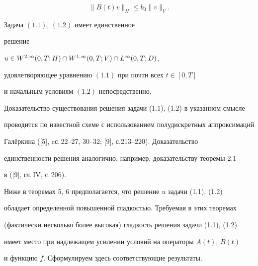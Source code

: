 \begin{equation}


\|B(t)v\|_H\le b_0\|v\|_V.


\end{equation}





\begin{thm}


Задача $(1.1)$, $(1.2)$ имеет единственное


решение


$u\in W^{2,\infty}(0,T;H)\cap\linebreak W^{1,\infty}(0,T;V)\cap


L^{\infty}(0,T;D)$,


удовлетворяющее уравнению $(1.1)$ при почти всех $t\in[0,T]$


и начальным условиям $(1.2)$ непосредственно.


\end{thm}





Доказательство существования решения задачи (1.1), (1.2) в указанном смысле


проводится по известной схеме с использованием полудискретных аппроксимаций


Гал\"еркина ([5], cс.\,22--27, 30--32; [9], с.213--220). Доказательство


единственности решения аналогично, например, доказательству теоремы 2.1


в ([9], гл.\,IV, с.\,206).





Ниже в теоремах 5, 6 предполагается, что решение $u$ задачи (1.1), (1.2)


обладает определенной повышенной гладкостью. Требуемая в этих теоремах


(фактически несколько более высокая) гладкость решения задачи (1.1), (1.2)


имеет место при надлежащем усилении условий на операторы $A(t)$, $B(t)$


и функцию $f$. Сформулируем здесь соответствующие результаты.





